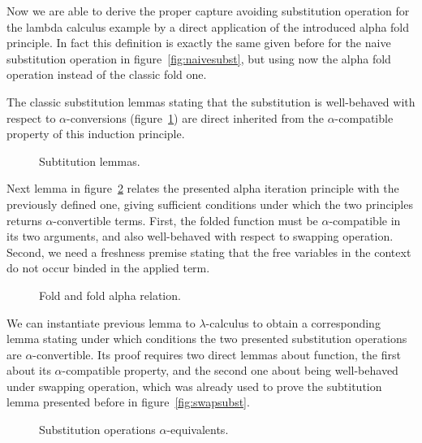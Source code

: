 \documentclass{book}
\newcommand{\alp}{\ensuremath{\alpha}}
\begin{document}
{Now we are able to derive the proper capture avoiding substitution operation for the lambda calculus example by  a direct application of the introduced alpha fold principle. In fact this definition is exactly the same given before for the naive substitution operation in figure~\ref{fig:naivesubst}, but using now the alpha fold operation instead of the classic fold one.


The classic substitution lemmas stating that the substitution is well-behaved with respect to \alp-conversions (figure~\ref{fig:substprop}) are direct inherited from the \alp-compatible property of this induction principle.

\begin{figure}[h]

  \hspace{150px}

  \caption{Subtitution lemmas.}
\label{fig:substprop}
\end{figure}


Next lemma in figure~\ref{fig:foldfoldalpha} relates the presented alpha iteration principle with the previously defined one, giving sufficient conditions under which the two principles returns \alp-convertible terms. First, the folded function must be \alp-compatible in its two arguments, and also well-behaved with respect to swapping operation. Second, we need a freshness premise stating that the free variables in the context do not occur binded in the applied term.

\begin{figure}[h]
  \caption{Fold and fold alpha relation.}
\label{fig:foldfoldalpha}
\end{figure}

We can instantiate previous lemma to $\lambda$-calculus to obtain a corresponding lemma stating under which conditions the two presented substitution operations are \alp-convertible. Its proof requires two direct lemmas about  function, the first about its \alp-compatible property, and the second one about being well-behaved under swapping operation, which was already used to prove the subtitution lemma presented before in figure~\ref{fig:swapsubst}.

\begin{figure}[h]
  \caption{Substitution operations \alp-equivalents.}
\label{fig:substalpha}
\end{figure}

}
\end{document}
